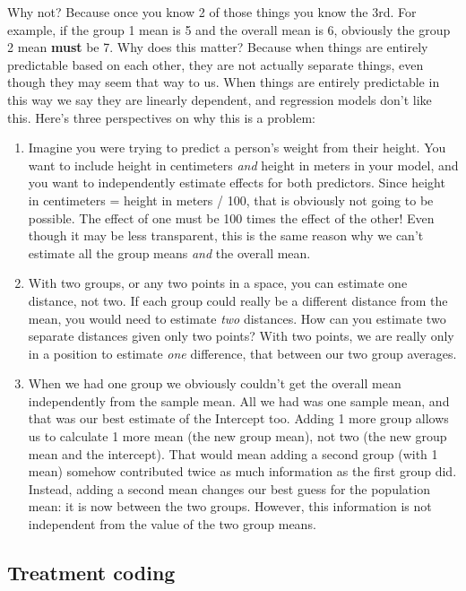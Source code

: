 \documentclass[
]{book}
\begin{document}
Why not? Because once you know 2 of those things you know the 3rd. For example, if the group 1 mean is 5 and the overall mean is 6, obviously the group 2 mean \textbf{must} be 7. Why does this matter? Because when things are entirely predictable based on each other, they are not actually separate things, even though they may seem that way to us. When things are entirely predictable in this way we say they are linearly dependent, and regression models don't like this. Here's three perspectives on why this is a problem:

\begin{enumerate}
\def\labelenumi{\arabic{enumi})}
\item
  Imagine you were trying to predict a person's weight from their height. You want to include height in centimeters \emph{and} height in meters in your model, and you want to independently estimate effects for both predictors. Since height in centimeters = height in meters / 100, that is obviously not going to be possible. The effect of one must be 100 times the effect of the other! Even though it may be less transparent, this is the same reason why we can't estimate all the group means \emph{and} the overall mean.
\item
  With two groups, or any two points in a space, you can estimate one distance, not two. If each group could really be a different distance from the mean, you would need to estimate \emph{two} distances. How can you estimate two separate distances given only two points? With two points, we are really only in a position to estimate \emph{one} difference, that between our two group averages.
\item
  When we had one group we obviously couldn't get the overall mean independently from the sample mean. All we had was one sample mean, and that was our best estimate of the Intercept too. Adding 1 more group allows us to calculate 1 more mean (the new group mean), not two (the new group mean and the intercept). That would mean adding a second group (with 1 mean) somehow contributed twice as much information as the first group did. Instead, adding a second mean changes our best guess for the population mean: it is now between the two groups. However, this information is not independent from the value of the two group means.
\end{enumerate}

\hypertarget{treatment-coding}{%
\subsection{Treatment coding}\label{treatment-coding}}
\end{document}
